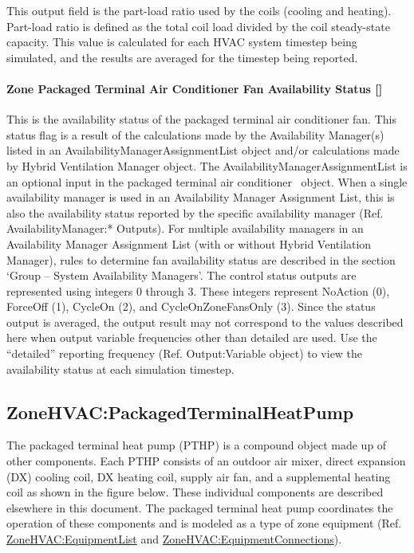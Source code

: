 This output field is the part-load ratio used by the coils (cooling and heating). Part-load ratio is defined as the total coil load divided by the coil steady-state capacity. This value is calculated for each HVAC system timestep being simulated, and the results are averaged for the timestep being reported.

\paragraph{Zone Packaged Terminal Air Conditioner Fan Availability Status {[]}}\label{zone-packaged-terminal-air-conditioner-fan-availability-status}

This is the availability status of the packaged terminal air conditioner fan. This status flag is a result of the calculations made by the Availability Manager(s) listed in an AvailabilityManagerAssignmentList object and/or calculations made by Hybrid Ventilation Manager object. The AvailabilityManagerAssignmentList is an optional input in the packaged terminal air conditioner~ object. When a single availability manager is used in an Availability Manager Assignment List, this is also the availability status reported by the specific availability manager (Ref. AvailabilityManager:* Outputs). For multiple availability managers in an Availability Manager Assignment List (with or without Hybrid Ventilation Manager), rules to determine fan availability status are described in the section `Group -- System Availability Managers'. The control status outputs are represented using integers 0 through 3. These integers represent NoAction (0), ForceOff (1), CycleOn (2), and CycleOnZoneFansOnly (3). Since the status output is averaged, the output result may not correspond to the values described here when output variable frequencies other than detailed are used. Use the ``detailed'' reporting frequency (Ref. Output:Variable object) to view the availability status at each simulation timestep.

\subsection{ZoneHVAC:PackagedTerminalHeatPump}\label{zonehvacpackagedterminalheatpump}

The packaged terminal heat pump (PTHP) is a compound object made up of other components. Each PTHP consists of an outdoor air mixer, direct expansion (DX) cooling coil, DX heating coil, supply air fan, and a supplemental heating coil as shown in the figure below. These individual components are described elsewhere in this document. The packaged terminal heat pump coordinates the operation of these components and is modeled as a type of zone equipment (Ref. \hyperref[zonehvacequipmentlist]{ZoneHVAC:EquipmentList} and \hyperref[zonehvacequipmentconnections]{ZoneHVAC:EquipmentConnections}).

